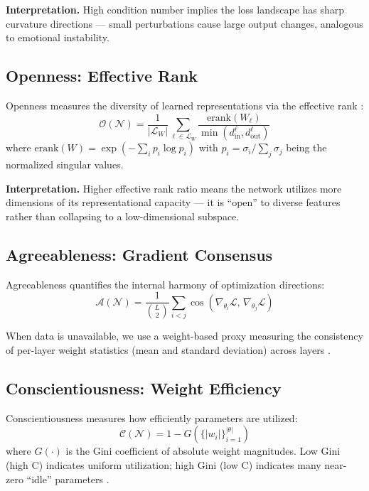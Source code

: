 \documentclass[letterpaper]{article}
\begin{document}
\textbf{Interpretation.} High condition number implies the loss landscape has sharp curvature directions \citep{li2018visualizing} — small perturbations cause large output changes, analogous to emotional instability.

\subsection{Openness: Effective Rank}

Openness measures the diversity of learned representations via the effective rank \citep{roy2007effective}:
\begin{equation}
    \mathcal{O}(\mathcal{N}) = \frac{1}{|\mathcal{L}_W|} \sum_{\ell \in \mathcal{L}_W} \frac{\text{erank}(W_\ell)}{\min(d_{\text{in}}^\ell, d_{\text{out}}^\ell)}
    \label{eq:openness}
\end{equation}
where $\text{erank}(W) = \exp\!\left(-\sum_i p_i \log p_i\right)$ with $p_i = \sigma_i / \sum_j \sigma_j$ being the normalized singular values.

\textbf{Interpretation.} Higher effective rank ratio means the network utilizes more dimensions of its representational capacity — it is ``open'' to diverse features rather than collapsing to a low-dimensional subspace.

\subsection{Agreeableness: Gradient Consensus}

Agreeableness quantifies the internal harmony of optimization directions:
\begin{equation}
    \mathcal{A}(\mathcal{N}) = \frac{1}{\binom{L}{2}} \sum_{i < j} \cos\!\left(\nabla_{\theta_i} \mathcal{L}, \, \nabla_{\theta_j} \mathcal{L}\right)
    \label{eq:agreeableness}
\end{equation}

When data is unavailable, we use a weight-based proxy measuring the consistency of per-layer weight statistics (mean and standard deviation) across layers \citep{yu2020gradient}.

\subsection{Conscientiousness: Weight Efficiency}

Conscientiousness measures how efficiently parameters are utilized:
\begin{equation}
    \mathcal{C}(\mathcal{N}) = 1 - G(\{|w_i|\}_{i=1}^{|\theta|})
    \label{eq:conscientiousness}
\end{equation}
where $G(\cdot)$ is the Gini coefficient of absolute weight magnitudes. Low Gini (high C) indicates uniform utilization; high Gini (low C) indicates many near-zero ``idle'' parameters \citep{frankle2019lottery}.
\end{document}
